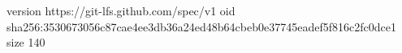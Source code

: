 version https://git-lfs.github.com/spec/v1
oid sha256:3530673056c87cae4ee3db36a24ed48b64cbeb0e37745eadef5f816c2fc0dce1
size 140
